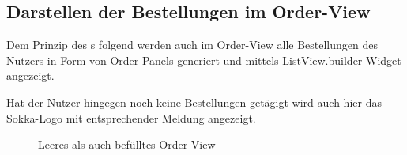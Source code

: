 \newpage

\subsection{Darstellen der Bestellungen im Order-View}

Dem Prinzip des s folgend werden auch im Order-View alle Bestellungen des Nutzers
in Form von Order-Panels generiert und mittels ListView.builder-Widget angezeigt.

Hat der Nutzer hingegen noch keine Bestellungen getägigt wird auch hier das Sokka-Logo mit entsprechender
Meldung angezeigt.

\begin{figure}[H]
    \centering
    \hfill
    \hfill
    \hfill
    \caption{Leeres als auch befülltes Order-View}
\end{figure}